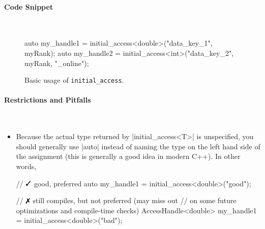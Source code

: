 \paragraph{Code Snippet}\mbox{}\\
\begin{figure}[!h]
\begin{CppCodeNumb}
  auto my_handle1 = initial_access<double>("data_key_1", myRank);
  auto my_handle2 = initial_access<int>("data_key_2", myRank, "_online");
\end{CppCodeNumb}
\label{fig:fe_api_initialaccess}
\caption{Basic usage of \lstinline|initial_access|.}
\end{figure}

\paragraph{Restrictions and Pitfalls}\mbox{}\\ 
\begin{itemize}
  \item Because the actual type returned by |initial_access<T>| is
  unspecified, you should generally use |auto| instead of naming the type on 
  the left hand side of the assignment (this is generally a good idea in modern
  C++). In other words,
  \begin{CppCode}
	// $\yes$ good, preferred
	auto my_handle1 = initial_access<double>("good"); 

	// $\no$ still compiles, but not preferred (may miss out
	//  on some future optimizations and compile-time checks)
	AccessHandle<double> my_handle1 = initial_access<double>("bad"); 
  \end{CppCode}
\end{itemize}



